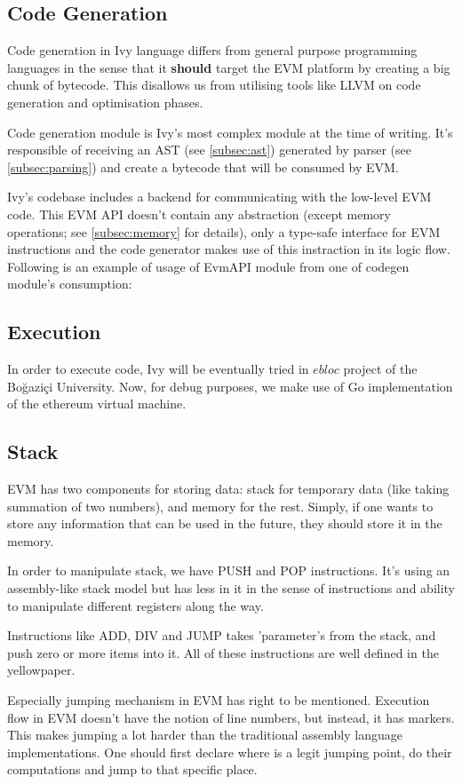 \documentclass{article}
\begin{document}
\subsection{Code Generation}
\label{subsec:code_generation}
\par Code generation in Ivy language differs from general purpose programming languages in the sense that it \textbf{should} target the EVM platform by creating a big chunk of bytecode. This disallows us from utilising tools like LLVM\cite{llvm} on code generation and optimisation phases.
\par Code generation module is Ivy's most complex module at the time of writing. It's responsible of receiving an AST (see \ref{subsec:ast}) generated by parser (see \ref{subsec:parsing}) and create a bytecode that will be consumed by EVM.
\par Ivy's codebase includes a backend for communicating with the low-level EVM code. This EVM API doesn't contain any abstraction (except memory operations; see \ref{subsec:memory} for details), only a type-safe interface for EVM instructions and the code generator makes use of this instraction in its logic flow. Following is an example of usage of EvmAPI module from one of codegen module's consumption:

\subsection{Execution}
\label{subsec:execution}
In order to execute code, Ivy will be eventually tried in $ebloc$ project of the Boğaziçi University. Now, for debug purposes, we make use of Go\cite{go} implementation of the ethereum virtual machine\cite{ethereum-go}.
\subsection{Stack}
\label{subsec:stack}
EVM has two components for storing data: stack for temporary data (like taking summation of two numbers), and memory for the rest. Simply, if one wants to store any information that can be used in the future, they should store it in the memory.
\par In order to manipulate stack, we have PUSH and POP instructions. It's using an assembly-like stack model but has less in it in the sense of instructions and ability to manipulate different registers along the way.
\par Instructions like ADD, DIV and JUMP takes 'parameter's from the stack, and push zero or more items into it. All of these instructions are well defined in the yellowpaper\cite{yellowpaper}.
\par Especially jumping mechanism in EVM has right to be mentioned. Execution flow in EVM doesn't have the notion of line numbers, but instead, it has markers. This makes jumping a lot harder than the traditional assembly language implementations. One should first declare where is a legit jumping point, do their computations and jump to that specific place.
\end{document}
